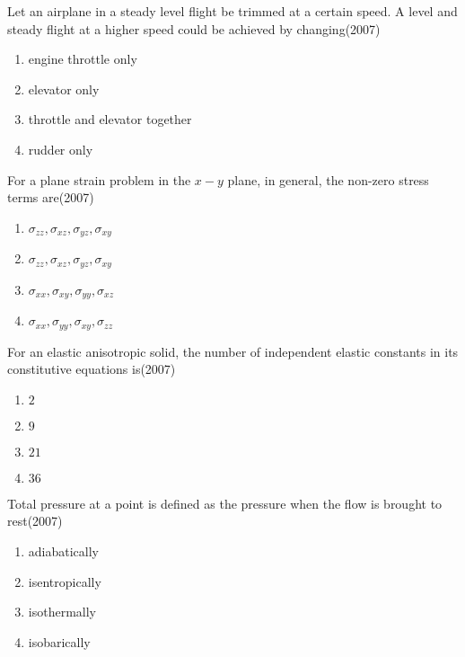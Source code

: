 \item Let an airplane in a steady level flight be trimmed at a certain speed. A level and steady flight at a higher speed could be achieved by changing\hfill(2007)
\begin{multicols}{2}
\begin{enumerate}
\item engine throttle only
\item elevator only
\item throttle and elevator together
\item rudder only
\end{enumerate}
\end{multicols}


\item For a plane strain problem in the $x-y$ plane, in general, the non-zero stress terms are\hfill(2007)
\begin{multicols}{2}
\begin{enumerate}
\item $\sigma_{zz},\sigma_{xz},\sigma_{yz},\sigma_{xy}$
\item $\sigma_{zz},\sigma_{xz},\sigma_{yz},\sigma_{xy}$
\item $\sigma_{xx},\sigma_{xy},\sigma_{yy},\sigma_{xz}$
\item $\sigma_{xx},\sigma_{yy},\sigma_{xy},\sigma_{zz}$
\end{enumerate}
\end{multicols}


\item For an elastic anisotropic solid, the number of independent elastic constants in its constitutive equations is\hfill(2007)
\begin{multicols}{2}
\begin{enumerate}
\item $2$
\item $9$
\item $21$
\item $36$
\end{enumerate}
\end{multicols}


\item Total pressure at a point is defined as the pressure when the flow is brought to rest\hfill(2007)
\begin{multicols}{2}
\begin{enumerate}
\item adiabatically
\item isentropically
\item isothermally
\item isobarically
\end{enumerate}
\end{multicols}


